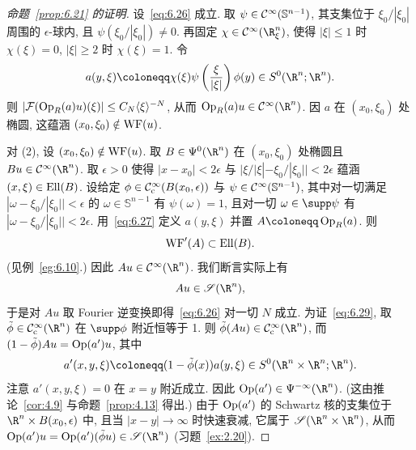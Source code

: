 \begin{proof}[命题~\ref{prop:6.21} 的证明]
设~\eqref{eq:6.26} 成立. 取 $\psi \in \mathcal{C}^\infty(\mathbb{S}^{n-1})$, 其支集位于 $\xi_0/|\xi_0|$ 周围的 $\epsilon$-球内, 且 $\psi(\xi_0/|\xi_0|) \neq 0$. 再固定 $\chi \in \Smooth(\R^n_\xi)$, 使得 $|\xi| \le 1$ 时 $\chi(\xi) = 0$, $|\xi| \ge 2$ 时 $\chi(\xi) = 1$. 令
\begin{equation}\label{eq:6.27}
    a(y, \xi) \defeq \chi(\xi) \psi\left( \frac{\xi}{|\xi|} \right) \phi(y) \in S^0(\R^n; \R^n).
\end{equation}
则 $|\mathcal{F}(\operatorname{Op}_R(a) u)(\xi)| \le C_N \langle \xi \rangle^{-N}$, 从而 $\OpR(a) u \in \Smooth(\R^n)$. 因 $a$ 在 $(x_0, \xi_0)$ 处椭圆, 这蕴涵 $(x_0, \xi_0) \notin \operatorname{WF}(u)$.

对 (2), 设 $(x_0, \xi_0) \notin \operatorname{WF}(u)$. 取 $B \in \Psi^0(\R^n)$ 在 $(x_0, \xi_0)$ 处椭圆且 $B u \in \Smooth(\R^n)$. 取 $\epsilon > 0$ 使得 $|x - x_0| < 2\epsilon$ 与 $|\xi/|\xi| - \xi_0/|\xi_0|| < 2\epsilon$ 蕴涵 $(x, \xi) \in \operatorname{Ell}(B)$. 设给定 $\phi \in \mathcal{C}_{\mathrm{c}}^\infty(B(x_0, \epsilon))$ 与 $\psi \in \mathcal{C}^\infty(\mathbb{S}^{n-1})$, 其中对一切满足 $|\omega - \xi_0/|\xi_0|| < \epsilon$ 的 $\omega \in \mathbb{S}^{n-1}$ 有 $\psi(\omega) = 1$, 且对一切 $\omega \in \supp \psi$ 有 $|\omega - \xi_0/|\xi_0|| < 2\epsilon$. 用~\eqref{eq:6.27} 定义 $a(y, \xi)$ 并置 $A \defeq \OpR(a)$. 则
\begin{equation}\label{eq:6.28}
    \operatorname{WF}'(A) \subset \operatorname{Ell}(B).
\end{equation}
(见例~\ref{eg:6.10}.) 因此 $A u \in \Smooth(\R^n)$. 我们断言实际上有
\begin{equation}\label{eq:6.29}
    A u \in \mathscr{S}(\R^n),
\end{equation}
于是对 $A u$ 取 Fourier 逆变换即得~\eqref{eq:6.26} 对一切 $N$ 成立. 为证~\eqref{eq:6.29}, 取 $\tilde{\phi} \in \SmoothComp(\R^n)$ 在 $\supp \phi$ 附近恒等于 1. 则 $\tilde{\phi}(A u) \in \SmoothComp(\R^n)$, 而 $(1 - \tilde{\phi}) A u = \operatorname{Op}(a') u$, 其中
\begin{equation}\label{eq:6.30}
    a'(x, y, \xi) \defeq (1 - \tilde{\phi}(x)) a(y, \xi) \in S^0(\R^n \times \R^n; \R^n).
\end{equation}
注意 $a'(x, y, \xi) = 0$ 在 $x = y$ 附近成立. 因此 $\Op(a') \in \Psi^{-\infty}(\R^n)$. (这由推论~\ref{cor:4.9} 与命题~\ref{prop:4.13} 得出.) 由于 $\operatorname{Op}(a')$ 的 Schwartz 核的支集位于 $\R^n \times B(x_0, \epsilon)$ 中, 且当 $|x - y| \to \infty$ 时快速衰减, 它属于 $\mathscr{S}(\R^n \times \R^n)$, 从而 $\Op(a') u = \Op(a')(\tilde{\phi} u) \in \mathscr{S}(\R^n)$ (习题~\ref{ex:2.20}).
\end{proof}

